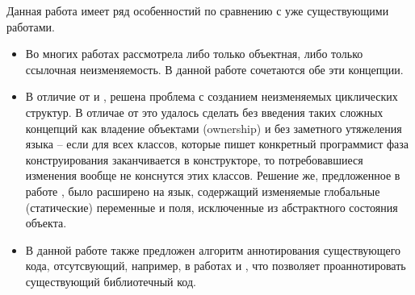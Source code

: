 Данная работа имеет ряд особенностий по сравнению с уже существующими работами. 

\begin{itemize}
	\item Во многих работах рассмотрела либо только объектная, либо только ссылочная неизменяемость. В данной работе сочетаются обе эти концепции.
	\item В отличие от \cite{Gordon2012} и \cite{Zibin2007}, решена проблема с созданием неизменяемых циклических структур. В отличае от \cite{Potanin} это удалось сделать без введения таких сложных концепций как владение объектами (ownership) и без заметного утяжеления языка -- если для всех классов, которые пишет конкретный программист фаза конструирования заканчивается в конструкторе, то потребовавшиеся изменения вообще не конснутся этих классов. Решение же, предложенное в работе \cite{Potanin}, было расширено на язык, содержащий изменяемые глобальные (статические) переменные и поля, исключенные из абстрактного состояния объекта.
	\item В данной работе также предложен алгоритм аннотирования существующего кода, отсутсвующий, например, в работах \cite{Zibin2007} и \cite{Potanin}, что позволяет проаннотировать существующий библиотечный код.  
\end{itemize}

























